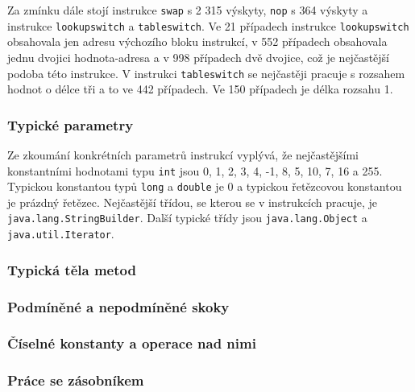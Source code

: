 Za zmínku dále stojí instrukce \texttt{swap} s 2 315 výskyty, \texttt{nop} s 364 výskyty a instrukce \texttt{lookupswitch} a \texttt{tableswitch}. Ve 21 případech instrukce \texttt{lookupswitch} obsahovala jen adresu výchozího bloku instrukcí, v 552 případech obsahovala jednu dvojici hodnota-adresa a v 998 případech dvě dvojice, což je nejčastější podoba této instrukce. V instrukci \texttt{tableswitch} se nejčastěji pracuje s rozsahem hodnot o délce tři a to ve 442 případech. Ve 150 případech je délka rozsahu 1.

\subsubsection{Typické parametry}

Ze zkoumání konkrétních parametrů instrukcí vyplývá, že nejčastějšími konstantními hodnotami typu \texttt{int} jsou 0, 1, 2, 3, 4, -1, 8, 5, 10, 7, 16 a 255. Typickou konstantou typů \texttt{long} a \texttt{double} je 0 a typickou řetězcovou konstantou je prázdný řetězec. Nejčastější třídou, se kterou se v instrukcích pracuje, je \texttt{java.lang.StringBuilder}. Další typické třídy jsou \texttt{java.lang.Object} a \texttt{java.util.Iterator}.

\subsubsection{Typická těla metod}

\subsubsection{Podmíněné a nepodmíněné skoky}


\subsubsection{Číselné konstanty a operace nad nimi}

\subsubsection{Práce se zásobníkem}

